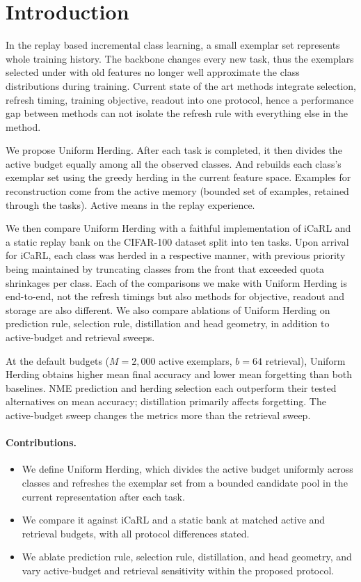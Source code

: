 \section{Introduction}
\label{sec:introduction}

In the replay based incremental class learning, a small exemplar set represents whole training history. The backbone changes every new task, thus the exemplars selected under with old features no longer well approximate the class distributions during training. Current state of the art methods integrate selection, refresh timing, training objective, readout into one protocol, hence a performance gap between methods can not isolate the refresh rule with everything else in the method.

We propose Uniform Herding.  After each task is completed, it then divides the active budget equally among all the observed classes. And rebuilds each class's exemplar set using the greedy herding in the current feature space. Examples for reconstruction come from the active memory (bounded set of examples, retained through the tasks). Active means in the replay experience.

We then compare Uniform Herding with a faithful implementation of iCaRL and a
static replay bank on the CIFAR-100 dataset split into ten tasks. Upon arrival for iCaRL, each class was herded in a respective manner, with previous priority being maintained by truncating classes from the front that exceeded quota shrinkages per class. Each of the comparisons we make with Uniform Herding is  end-to-end, not the refresh timings but also methods for objective, readout and storage are also different. We also compare ablations of Uniform Herding on prediction rule, selection rule, distillation and head geometry, in addition to active-budget and retrieval sweeps.

At the default budgets ($M{=}2{,}000$ active exemplars, $b{=}64$ retrieval),
Uniform Herding obtains higher mean final accuracy and lower mean forgetting
than both baselines.  NME prediction and herding selection each outperform
their tested alternatives on mean accuracy; distillation primarily affects
forgetting.  The active-budget sweep changes the metrics more than the
retrieval sweep.

\paragraph{Contributions.}
\begin{itemize}
  \item We define Uniform Herding, which divides the active budget uniformly
  across classes and refreshes the exemplar set from a bounded candidate pool
  in the current representation after each task.
  \item We compare it against iCaRL and a static bank at matched active and
  retrieval budgets, with all protocol differences stated.
  \item We ablate prediction rule, selection rule, distillation, and head
  geometry, and vary active-budget and retrieval sensitivity within the
  proposed protocol.
\end{itemize}

